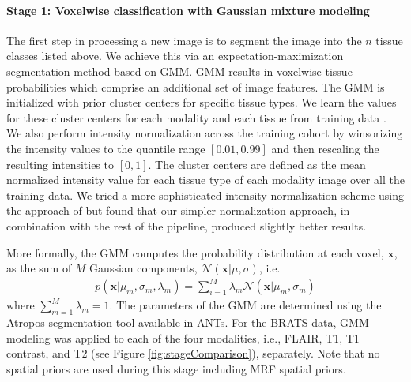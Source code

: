 \paragraph{Stage 1:  Voxelwise classification with Gaussian mixture
  modeling} 
The first step in processing a new image is to segment the image into
the $n$ tissue classes listed above.   We achieve this via an expectation-maximization
segmentation method based on
GMM.  GMM results in voxelwise
tissue probabilities which comprise an additional set of image
features.  The GMM is initialized with prior cluster centers for
specific tissue types.  We learn the values for these cluster centers
for each modality and each tissue from training data
\citep{reynolds2009}.  We also perform intensity normalization
across the training cohort by winsorizing the intensity values to the quantile
range $[0.01, 0.99]$ and then rescaling the resulting intensities to 
$[0, 1]$.  The cluster centers are defined as the mean
normalized intensity value for each tissue type of each modality 
image over all the training data.  We tried a more sophisticated intensity
normalization scheme using the approach of \cite{nyul2000} but found that
our simpler normalization approach, in combination with the rest of the
pipeline, produced slightly better results.  

More formally, the GMM computes the 
probability distribution at each voxel, $\mathbf{x}$, as the
sum of $M$ Gaussian components, $\mathcal{N}(\mathbf{x}|\mu,\sigma)$, i.e.
\begin{align}
p\left(\mathbf{x}|\mu_m,\sigma_m,\lambda_m\right) = \sum_{i=1}^M \lambda_m \mathcal{N}(\mathbf{x}|\mu_m,\sigma_m)
\end{align}
where $\sum_{m=1}^M \lambda_m = 1$.  The parameters of the GMM 
are determined using the Atropos segmentation tool \citep{avants2011} available in ANTs.
For the BRATS data, GMM modeling was applied to each of the four modalities, i.e.,
FLAIR, T1, T1 contrast, and T2 (see Figure \ref{fig:stageComparison}), separately.  
Note that no spatial priors are used during this stage including MRF spatial priors.

